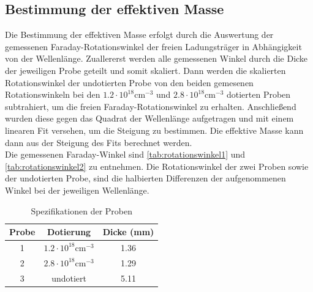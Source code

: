 \subsection{Bestimmung der effektiven Masse}
Die Bestimmung der effektiven Masse erfolgt durch die Auswertung der gemessenen
Faraday-Rotationswinkel der freien Ladungsträger in Abhängigkeit von der
Wellenlänge. Zuallererst werden alle gemessenen Winkel durch die Dicke der jeweiligen
Probe geteilt und somit skaliert. Dann werden die skalierten Rotationswinkel der
undotierten Probe von den beiden gemesenen Rotationswinkeln bei den
$1.2\cdot10^{18} \text{cm}^{-3}$ und $2.8\cdot10^{18} \text{cm}^{-3}$ dotierten
Proben subtrahiert, um die freien Faraday-Rotationswinkel zu erhalten. Anschließend
wurden diese gegen das Quadrat der Wellenlänge aufgetragen und mit einem linearen
Fit versehen, um die Steigung zu bestimmen. Die effektive Masse kann dann aus der
Steigung des Fits berechnet werden.  
\vspace{0.5cm}
\\
\noindent Die gemessenen Faraday-Winkel sind \autoref{tab:rotationswinkel1} und
\autoref{tab:rotationswinkel2} zu entnehmen. Die Rotationswinkel der zwei Proben
sowie der undotierten Probe, sind die halbierten Differenzen der aufgenommenen 
Winkel bei der jeweiligen Wellenlänge.
\begin{table}[H]
    \centering
    \caption{Spezifikationen der Proben}
    \label{tab:proben}
    \begin{tabular}{c|c|c}
        Probe & Dotierung & Dicke (mm) \\
        \hline
        1 & $1.2\cdot10^{18} \text{cm}^{-3}$ & 1.36 \\
        2 & $2.8\cdot10^{18} \text{cm}^{-3}$ & 1.29 \\
        3 & undotiert & 5.11 \\
    \end{tabular}
\end{table}
